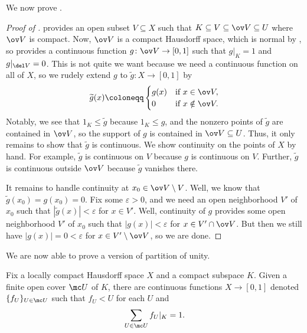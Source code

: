 \documentclass[../notes.tex]{subfiles}
\begin{document}
We now prove .
\begin{proof}[Proof of ]
	 provides an open subset $V\subseteq X$ such that $K\subseteq V\subseteq\ov V\subseteq U$ where $\ov V$ is compact. Now, $\ov V$ is a compact Hausdorff space, which is normal by , so  provides a continuous function $g\colon\ov V\to[0,1]$ such that $g|_K=1$ and $g|_{\del V}=0$. This is not quite we want because we need a continuous function on all of $X$, so we rudely extend $g$ to $\widetilde g\colon X\to[0,1]$ by
	\[\widetilde g(x)\coloneqq\begin{cases}
		g(x) & \text{if }x\in\ov V, \\
		0 & \text{if }x\notin\ov V.
	\end{cases}\]
	Notably, we see that $1_K\le\widetilde g$ because $1_K\le g$, and the nonzero points of $\widetilde g$ are contained in $\ov V$, so the support of $g$ is contained in $\ov V\subseteq U$. Thus, it only remains to show that $\widetilde g$ is continuous. We show continuity on the points of $X$ by hand. For example, $\widetilde g$ is continuous on $V$ because $g$ is continuous on $V$. Further, $\widetilde g$ is continuous outside $\ov V$ because $\widetilde g$ vanishes there.

	It remains to handle continuity at $x_0\in\ov V\setminus V$. Well, we know that $\widetilde g(x_0)=g(x_0)=0$. Fix some $\varepsilon>0$, and we need an open neighborhood $V'$ of $x_0$ such that $\left|\widetilde g(x)\right|<\varepsilon$ for $x\in V'$. Well, continuity of $g$ provides some open neighborhood $V'$ of $x_0$ such that $\left|g(x)\right|<\varepsilon$ for $x\in V'\cap\ov V$. But then we still have $\left|g(x)\right|=0<\varepsilon$ for $x\in V'\setminus\ov V$, so we are done.
\end{proof}
We are now able to prove a version of partition of unity.
\begin{theorem} \label{thm:partition-unity}
	Fix a locally compact Hausdorff space $X$ and a compact subspace $K$. Given a finite open cover $\mc U$ of $K$, there are continuous functions $X\to[0,1]$ denoted $\{f_U\}_{U\in\mc U}$ such that $f_U<U$ for each $U$ and
	\[\sum_{U\in\mc U}f_U|_K=1.\]
\end{theorem}
\end{document}
